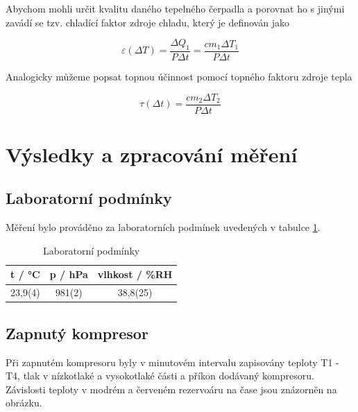 Abychom mohli určit kvalitu daného tepelného čerpadla a porovnat ho s jinými zavádí se tzv. chladící faktor zdroje chladu, který je definován jako

\begin{equation}
    \varepsilon (\Delta T) = \frac{\Delta Q_1}{P \Delta t} = \frac{c m_1 \Delta T_1}{P \Delta t}
\end{equation}

Analogicky můžeme popsat topnou účinnost pomocí topného faktoru zdroje tepla

\begin{equation}
    \tau (\Delta t) = \frac{c m_2 \Delta T_2}{P \Delta t}
\end{equation}

\section{Výsledky a zpracování měření}

\subsection{Laboratorní podmínky}

    Měření bylo prováděno za laboratorních podmínek uvedených v tabulce \ref{tab:laboratorni-podminky}.

    \begin{table}[h]
        \centering
        \begin{tabular}{|c|c|c|} 
        \hline
            t / °C & p / hPa & vlhkost / \%RH  \\ 
        \hline
            23,9(4)   & 981(2)   & 38,8(25)            \\
        \hline
        \end{tabular}
        \caption{Laboratorní podmínky}
        \label{tab:laboratorni-podminky}
    \end{table}

\subsection{Zapnutý kompresor}

Při zapnutém kompresoru byly v minutovém intervalu zapisovány teploty T1 - T4, tlak v nízkotlaké a vysokotlaké části a příkon dodávaný kompresoru. Závislosti teploty v modrém a červeném rezervoáru na čase jsou znázorněn na obrázku.

